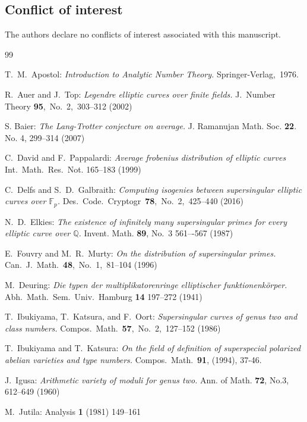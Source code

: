 \documentclass[a4paper, 11pt]{article}
\theoremstyle{plain}
\newcommand{\?}{\textcolor{red}{??}}
\newcommand{\fp}{\mathbb{F}_p}
\begin{document}
\subsection*{Conflict of interest}
The authors declare no conflicts of interest associated with this manuscript.
\begin{thebibliography}{99}

T.\ M.\ Apostol: \textit{Introduction to Analytic Number Theory.}
Springer-Verlag,\ 1976.

 
R.\ Auer and J.\ Top:
\textit{Legendre elliptic curves over finite fields.}
J.\ Number Theory {\bf 95},\ No.\ 2,\ 303--312 (2002)


S. Baier:
\textit{The Lang-Trotter conjecture on average.}
J. Ramanujan Math. Soc. {\bf 22}. No. 4, 299--314 (2007)

C.\ David and F.\ Pappalardi:
\textit{Average frobenius distribution of elliptic curves}
Int.\ Math.\ Res.\ Not. 165--183 (1999)

C.\ Delfs and S.\ D.\ Galbraith:
\textit{Computing isogenies between supersingular elliptic curves over $\fp$.} 
Des.\ Code.\ Cryptogr\ {\bf 78},\ No.\ 2,\ 425--440 (2016)

N.\ D.\ Elkies: 
\textit{The existence of infinitely many supersingular primes for every elliptic curve over $\mathbb Q$.} 
Invent. Math. {\bf 89}, No.\ 3 561–-567 (1987)


E.\ Fouvry and M.\ R.\ Murty:
\textit{On the distribution of supersingular primes.}
Can.\ J.\ Math.\ {\bf 48},\ No.\ 1,\ 81--104 (1996)

M.\ Deuring:
\textit{Die typen der multiplikatorenringe elliptischer funktionenk\"{o}rper.}
Abh.\ Math.\ Sem.\ Univ.\ Hamburg  {\bf 14} 197--272 (1941) 

 T.\ Ibukiyama, T.\ Katsura, and F.\ Oort:
 \textit{Supersingular curves of genus two and class numbers.}
 Compos.\  Math.\ {\bf 57},\ No.\ 2,\ 127--152 (1986)

 T.\ Ibukiyama and T.\ Katsura:
 \textit{On the field of definition of superspecial
polarized abelian varieties and type numbers.}
Compos.\ Math.\  {\bf 91}, (1994), 37-46.


J.\ Igusa:
\textit{Arithmetic variety of moduli for genus two.}
Ann. of Math. {\bf 72}, No.3, 612--649 (1960)

M.\ Jutila:
Analysis {\bf 1} (1981) 149--161 


\end{thebibliography}
\end{document}
